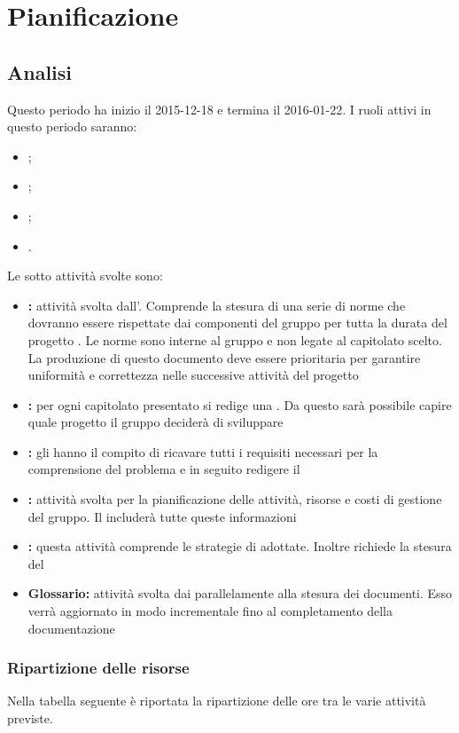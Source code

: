 \documentclass[12pt,a4paper]{article}
\begin{document}
\newpage
\section{Pianificazione}

\subsection{Analisi} %
Questo periodo ha inizio il 2015-12-18 e termina il 2016-01-22. I ruoli attivi in questo periodo saranno:
\begin{itemize}
	\item \PM{};
	\item \AM{};
	\item \AN{};
	\item \VR{}.
\end{itemize}
Le sotto attività svolte sono:
\begin{itemize}
	\item \textbf{\NdP{}:} attività svolta dall’\AM{}. Comprende la stesura di una serie di norme che dovranno essere rispettate dai componenti del gruppo per tutta la durata del progetto \textit{\prjL{}}. Le norme sono interne al gruppo e non legate al capitolato scelto. La produzione di questo documento deve essere prioritaria per garantire uniformità e correttezza nelle successive attività del progetto
	\item \textbf{\SdF{}:} per ogni capitolato presentato si redige una \SdF{}. Da questo sarà possibile capire quale progetto il gruppo deciderà di sviluppare
	\item \textbf{\AdR{}:} gli  hanno il compito di ricavare tutti i requisiti necessari per la comprensione del problema e in seguito redigere il \AdR{}
	\item \textbf{\PdP{}:} attività svolta per la pianificazione delle attività, risorse e costi di gestione del gruppo. Il \PdP{} includerà tutte queste informazioni
	\item \textbf{\PdQ{}:} questa attività comprende le strategie di \FVV{} adottate. Inoltre richiede la stesura del \PdQ{}
	\item \textbf{Glossario:} attività svolta dai  parallelamente alla stesura dei documenti. Esso verrà aggiornato in modo incrementale fino al completamento della documentazione
\end{itemize}

\newpage
\subsubsection{Ripartizione delle risorse}
Nella tabella seguente è riportata la ripartizione delle ore tra le varie attività previste.
\end{document}
